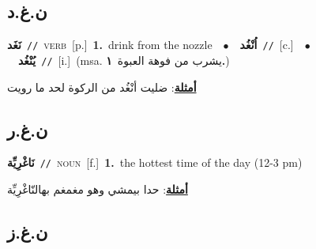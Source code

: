 \documentclass[10pt,a4paper,twoside]{article} %
\begin{document}
\begin{multicols}{2}
\vspace{-3mm}
\subsection*{\color{blue}\foreignlanguage{arabic}{ن.غ.د}\color{blue}{}} 

{\setlength\topsep{0pt}\textbf{\foreignlanguage{arabic}{نَغَد}}\ {\color{gray}\texttt{//}\color{black}}\ \textsc{verb}\ [p.]\ \textbf{1.}~drink from the nozzle\ \ $\bullet$\ \ \setlength\topsep{0pt}\textbf{\foreignlanguage{arabic}{اُنْغُد}}\ {\color{gray}\texttt{//}\color{black}}\ [c.]\ \ $\bullet$\ \ \setlength\topsep{0pt}\textbf{\foreignlanguage{arabic}{يُنْغُد}}\ {\color{gray}\texttt{//}\color{black}}\ [i.]\ \color{gray}(msa. \foreignlanguage{arabic}{يشرب من فوهة العبوة}~\foreignlanguage{arabic}{\textbf{١.}})\color{black}\  \begin{flushright}\color{gray}\foreignlanguage{arabic}{\textbf{\underline{\foreignlanguage{arabic}{أمثلة}}}: ضليت أنْغُد من الركوة لحد ما رويت}\end{flushright}\color{black}} \vspace{2mm}

\vspace{-3mm}
\subsection*{\color{blue}\foreignlanguage{arabic}{ن.غ.ر}\color{blue}{}} 

{\setlength\topsep{0pt}\textbf{\foreignlanguage{arabic}{نَاغْرِيِّة}}\ {\color{gray}\texttt{//}\color{black}}\ \textsc{noun}\ [f.]\ \textbf{1.}~the hottest time of the day (12-3 pm)\  \begin{flushright}\color{gray}\foreignlanguage{arabic}{\textbf{\underline{\foreignlanguage{arabic}{أمثلة}}}: حدا بيمشي وهو مغمغم بهالنّاغْرِيِّة}\end{flushright}\color{black}} \vspace{2mm}

\vspace{-3mm}
\subsection*{\color{blue}\foreignlanguage{arabic}{ن.غ.ز}\color{blue}{}} 


\end{multicols}
\end{document}
